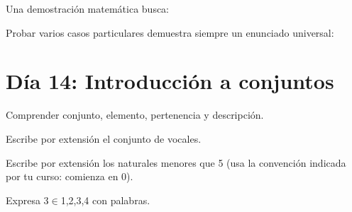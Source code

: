 \begin{activity}[id=dia-13-opcion-01,type=choice,weight=1]

Una demostración matemática busca:





\end{activity}

\begin{activity}[id=dia-13-opcion-02,type=choice,weight=1]

Probar varios casos particulares demuestra siempre un enunciado universal:





\end{activity}

\section{Día 14: Introducción a conjuntos}

\begin{lesson}[id=dia-14-lectura,weight=0]

Comprender conjunto, elemento, pertenencia y descripción.

\end{lesson}

\begin{activity}[id=dia-14-corta-01,type=short,weight=1]

Escribe por extensión el conjunto de vocales.

\end{activity}

\begin{activity}[id=dia-14-corta-02,type=short,weight=1]

Escribe por extensión los naturales menores que 5 (usa la convención indicada por tu curso: comienza en 0).

\end{activity}

\begin{activity}[id=dia-14-corta-03,type=short,weight=1]

Expresa 3\(\in\){1,2,3,4} con palabras.

\end{activity}

